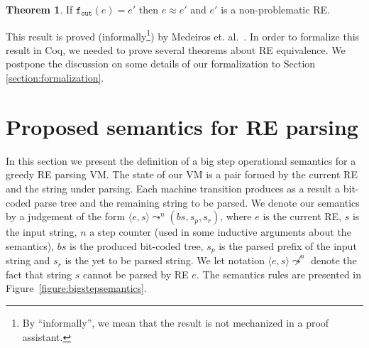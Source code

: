 \documentclass[review]{elsarticle}
\newcommand{\fout}{\ensuremath{\texttt{f$_{\texttt{out}}$}}}
\theoremstyle{definition}
\newtheorem{Theorem}{Theorem}
\begin{document}
\begin{Theorem}
   If $\fout(e) = e'$ then $e \approx e'$ and $e'$ is a non-problematic RE.
\end{Theorem}

This result is proved (informally\footnote{By ``informally'', we mean that the
  result is not mechanized in a proof assistant.}) by Medeiros et. al.~\cite{Medeiros14}. In order to formalize this result
in Coq, we needed to prove several theorems about RE equivalence. We postpone the discussion on some details
of our formalization to Section \ref{section:formalization}.


\section{Proposed semantics for RE parsing}\label{section:semantics}

In this section we present the definition of a big step operational semantics
for a greedy RE parsing VM. The state of our VM is a pair formed by the current
RE and the string under parsing. Each machine 
transition produces as a result a bit-coded parse tree and the remaining string to be 
parsed. We denote our semantics by a judgement of the form $\langle e, s \rangle \leadsto^n (bs,s_p,s_r)$,
where $e$ is the current RE, $s$ is the input string, $n$ a step counter (used
in some inductive arguments about the semantics), $bs$ is the produced bit-coded tree, $s_p$ is
the parsed prefix of the input string and $s_r$ is the yet to be parsed string.
We let notation $\langle e, s \rangle\not\leadsto^n$ denote the fact that string
$s$ cannot be parsed by RE $e$. The semantics rules are presented in Figure~\ref{figure:bigstepsemantics}.
\end{document}
